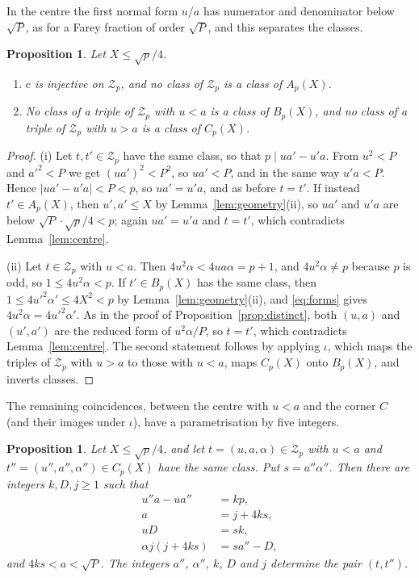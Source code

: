 \documentclass[aps,prd,twocolumn,superscriptaddress,nofootinbib,longbibliography,floatfix,showkeys,nobalancelastpage,amsmath,amssymb,10pt]{revtex4-2}
\theoremstyle{plain}
\newtheorem{proposition}[theorem]{Proposition}
\theoremstyle{definition}
\theoremstyle{plain}
\newcommand{\Zc}{\mathcal{Z}}
\newcommand{\cl}{\mathrm{c}}
\begin{document}
In the centre the first normal form $u/a$ has numerator and denominator below $\sqrt P$, as for a Farey fraction of order $\sqrt P$, and this separates the classes.

\begin{proposition}\label{prop:centre}
Let $X\le\sqrt p/4$.
\begin{enumerate}
\item[(i)] $\cl$ is injective on $\Zc_p$, and no class of $\Zc_p$ is a class of $A_p(X)$.
\item[(ii)] No class of a triple of $\Zc_p$ with $u<a$ is a class of $B_p(X)$, and no class of a triple of $\Zc_p$ with $u>a$ is a class of $C_p(X)$.
\end{enumerate}
\end{proposition}

\begin{proof}
(i) Let $t,t'\in\Zc_p$ have the same class, so that $p\mid ua'-u'a$. From $u^2<P$ and $a'^2<P$ we get $(ua')^2<P^2$, so $ua'<P$, and in the same way $u'a<P$. Hence $|ua'-u'a|<P<p$, so $ua'=u'a$, and as before $t=t'$. If instead $t'\in A_p(X)$, then $u',a'\le X$ by Lemma~\ref{lem:geometry}(ii), so $ua'$ and $u'a$ are below $\sqrt P\cdot\sqrt p/4<p$; again $ua'=u'a$ and $t=t'$, which contradicts Lemma~\ref{lem:centre}.

(ii) Let $t\in\Zc_p$ with $u<a$. Then $4u^2\alpha<4ua\alpha=p+1$, and $4u^2\alpha\ne p$ because $p$ is odd, so $1\le4u^2\alpha<p$. If $t'\in B_p(X)$ has the same class, then $1\le4u'^2\alpha'\le4X^2<p$ by Lemma~\ref{lem:geometry}(ii), and \eqref{eq:forms} gives $4u^2\alpha=4u'^2\alpha'$. As in the proof of Proposition~\ref{prop:distinct}, both $(u,a)$ and $(u',a')$ are the reduced form of $u^2\alpha/P$, so $t=t'$, which contradicts Lemma~\ref{lem:centre}. The second statement follows by applying $\iota$, which maps the triples of $\Zc_p$ with $u>a$ to those with $u<a$, maps $C_p(X)$ onto $B_p(X)$, and inverts classes.
\end{proof}

The remaining coincidences, between the centre with $u<a$ and the corner $C$ (and their images under $\iota$), have a parametrisation by five integers.

\begin{proposition}\label{prop:centreC}
Let $X\le\sqrt p/4$, and let $t=(u,a,\alpha)\in\Zc_p$ with $u<a$ and $t''=(u'',a'',\alpha'')\in C_p(X)$ have the same class. Put $s=a''\alpha''$. Then there are integers $k,D,j\ge1$ such that
\begin{align}
u''a-ua''&=kp,\label{eq:C0}\\
a&=j+4ks,\label{eq:C1}\\
uD&=sk,\label{eq:C2}\\
\alpha j(j+4ks)&=sa''-D,\label{eq:C3}
\end{align}
and $4ks<a<\sqrt P$. The integers $a''$, $\alpha''$, $k$, $D$ and $j$ determine the pair $(t,t'')$.
\end{proposition}
\end{document}
